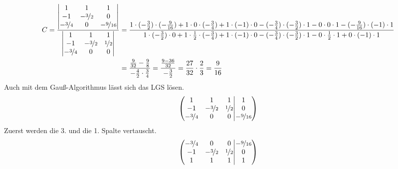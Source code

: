 \documentclass[11pt,a4paper,DIV=12]{scrartcl}
\begin{document}
\begin{align}
	C=\frac{\begin{vmatrix}
			1 & 1 & 1 \\
			-1 & -\nicefrac{3}{2} & 0 \\
			-\nicefrac{3}{4}& 0 & -\nicefrac{9}{16}
	\end{vmatrix}}{\begin{vmatrix}
			1 & 1 & 1 \\
			-1 & -\nicefrac{3}{2} & \nicefrac{1}{2} \\
			-\nicefrac{3}{4} & 0 & 0
	\end{vmatrix}}&=\frac{1\cdot(-\frac{3}{2})\cdot(-\frac{9}{16})+1\cdot 0 \cdot (-\frac{3}{4})+1\cdot (-1)\cdot 0-(-\frac{3}{4})\cdot (-\frac{3}{2})\cdot 1 -0 \cdot 0 \cdot 1 - (-\frac{9}{16})\cdot (-1)\cdot 1}{1\cdot (-\frac{3}{2})\cdot 0 +1\cdot \frac{1}{2}\cdot (-\frac{3}{4})+1\cdot (-1) \cdot 0- (-\frac{3}{4})\cdot (-\frac{3}{2})\cdot 1 -0\cdot \frac{1}{2}\cdot 1 + 0\cdot (-1) \cdot 1}\nonumber \\
	&=\frac{\frac{9}{32}-\frac{9}{8}}{-\frac{4}{2}\cdot\frac{3}{4}}=\frac{\frac{9-36}{32}}{-\frac{3}{2}}=\frac{27}{32}\cdot \frac{2}{3}=\frac{9}{16}
\end{align}
Auch mit dem Gauß-Algorithmus lässt sich das LGS lösen.
\begin{gather}
	\left\lparen\begin{matrix}
		1 & 1 & 1 \\
		-1 & -\nicefrac{3}{2} & \nicefrac{1}{2} \\
		-\nicefrac{3}{4} & 0 & 0
	\end{matrix}\middle\vert\begin{matrix}
		1 \\
		0 \\
		-\nicefrac{9}{16}
	\end{matrix}\right\rparen
\end{gather}
Zuerst werden die 3. und die 1. Spalte vertauscht.
\begin{gather}
	\left\lparen\begin{matrix}
		-\nicefrac{3}{4} & 0 & 0 \\
		-1 & -\nicefrac{3}{2} & \nicefrac{1}{2} \\
		1 & 1 & 1
	\end{matrix}\middle\vert\begin{matrix}
		-\nicefrac{9}{16} \\
		0 \\
		1
	\end{matrix}\right\rparen
\end{gather}
\end{document}
